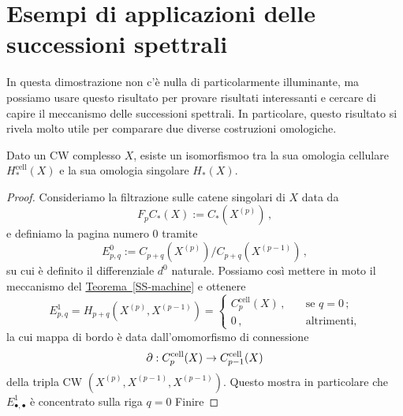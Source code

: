 \section{Esempi di applicazioni delle successioni spettrali}

In questa dimostrazione non c'è nulla di particolarmente illuminante,
ma possiamo usare questo risultato per provare risultati interessanti
e cercare di capire il meccanismo delle successioni spettrali.
In particolare, questo risultato si rivela molto utile 
per comparare due diverse costruzioni omologiche.

\begin{prop}
	Dato un CW complesso $X$, esiste un isomorfismoo tra
	la sua omologia cellulare $H^{\mathrm{cell}}_{*}(X)$
	e la sua omologia singolare $H_{*}(X)$.
	\begin{proof}
	Consideriamo la filtrazione sulle catene singolari di $X$ data da
	\begin{equation*}
		F_{p}C_{*}(X) := C_{*}\left( X^{(p)} \right)\,,
	\end{equation*}
	e definiamo la pagina numero $0$ tramite
	\begin{equation*}
		E^{0}_{p,q} := C_{p+q}\left( X^{(p)} \right) / C_{p+q}\left( X^{(p-1)} \right)\,,
	\end{equation*}
	su cui è definito il differenziale $d^{0}$ naturale. 
	Possiamo così mettere in moto il meccanismo del 
	\hyperref[SS-machine]{Teorema~\ref{SS-machine}} e ottenere
	\begin{equation*}
		E^{1}_{p,q} = H_{p+q}\left( X^{(p)}, X^{(p-1)} \right) =
		\begin{cases}
			C_{p}^{\mathrm{cell}}(X)\,, \quad &\text{se } q = 0\,; \\
			0\,, \quad &\text{altrimenti,}
		\end{cases}
	\end{equation*}
	la cui mappa di bordo è data dall'omomorfismo di connessione
	$$\partial : C_{p}^{\mathrm{cell}}(X) \to C_{p-1}^{\mathrm{cell}}(X)$$
	della tripla CW $\left( X^{(p)}, X^{(p-1)}, X^{(p-1)}\right)$.
	Questo mostra in particolare che $E^{1}_{\bullet,\bullet}$ è concentrato sulla riga $q=0$
	Finire
	\end{proof}
\end{prop}


